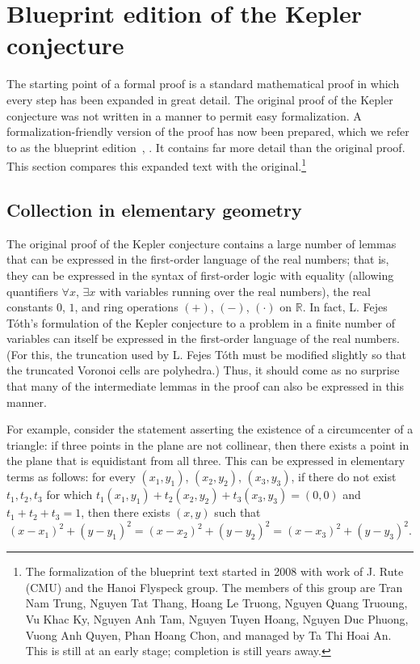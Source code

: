 \documentclass[11pt]{amsart}
\newcommand{\ring}[1]{\mathbb{#1}}
\begin{document}
\section{Blueprint edition of the Kepler conjecture}
\label{sec:blueprint}

The starting point of a formal proof is a standard mathematical proof in which every step
has been expanded in great detail.  The original proof of the Kepler conjecture was not written
in a manner to permit easy formalization.  A formalization-friendly version of the proof has
now been prepared, which we refer to as the blueprint edition~\cite{hales:2008:blueprint}, \cite{hales:2008:collection}.  It contains far more detail than the original proof.  This section 
compares this expanded text with the original.\footnote{The formalization of the blueprint text started in
2008 with work of J. Rute (CMU) and the Hanoi Flyspeck group. The members of this group are Tran Nam Trung, Nguyen Tat Thang, Hoang Le Truong, Nguyen Quang Truoung, Vu Khac Ky, Nguyen Anh Tam, Nguyen Tuyen Hoang, Nguyen Duc Phuong, Vuong Anh Quyen, Phan Hoang Chon, and managed by Ta Thi Hoai An.  This is still at an early stage; completion is still years away.}

\subsection*{Collection in elementary geometry}

The original proof of the Kepler conjecture contains a large number of lemmas that can be
expressed in the first-order language of the real numbers; that is, they can be expressed in
the syntax of first-order logic with equality (allowing quantifiers $\forall x$, $\exists x$ with variables
running over the real numbers), the real constants $0$, $1$, and ring operations $(+)$, $(-)$,
$(\cdot)$ on $\ring{R}$.  In fact, L. Fejes T\'oth's formulation of the Kepler conjecture to
a problem in a finite number of variables can itself be expressed in the
first-order language of the real numbers.  (For this, the truncation used by L. Fejes T\'oth must be modified slightly so that the truncated Voronoi cells are polyhedra.)  Thus, it should come as no surprise that many
of the intermediate lemmas in the proof can also be expressed in this manner.

For example, consider the statement asserting the existence of a circumcenter of a triangle: 
if three points in the plane are not collinear, then there exists a
point in the plane that is equidistant from all three.  This can be expressed in elementary terms
as follows:  for every $(x_1,y_1)$, $(x_2,y_2)$, $(x_3,y_3)$, if there do not exist $t_1,t_2,t_3$
for which $t_1 (x_1,y_1) + t_2 (x_2,y_2)+ t_3 (x_3,y_3) = (0,0)$ and $t_1+t_2+t_3=1$, then there exists
$(x,y)$ such that 
$$
  (x-x_1)^2 + (y-y_1)^2 = (x-x_2)^2 + (y-y_2)^2 = (x-x_3)^2 + (y-y_3)^2. 
$$
\end{document}
